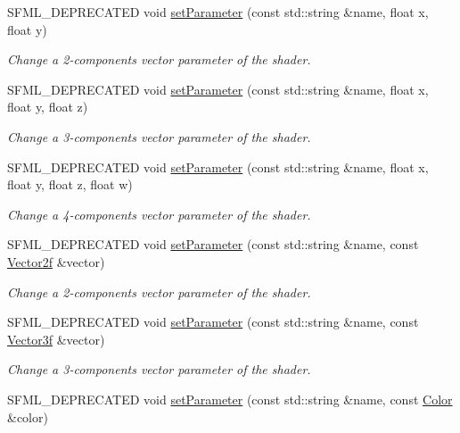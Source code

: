 \begin{DoxyCompactItemize}
S\+F\+M\+L\+\_\+\+D\+E\+P\+R\+E\+C\+A\+T\+ED void \hyperlink{classsf_1_1_shader_a61f5cdb5847fc3b57335b095a2f3dad3}{set\+Parameter} (const std\+::string \&name, float x, float y)
\begin{DoxyCompactList}\small\item\em Change a 2-\/components vector parameter of the shader. \end{DoxyCompactList}\item 
S\+F\+M\+L\+\_\+\+D\+E\+P\+R\+E\+C\+A\+T\+ED void \hyperlink{classsf_1_1_shader_a1fa0fb11cabd8553ccd37e97c725c992}{set\+Parameter} (const std\+::string \&name, float x, float y, float z)
\begin{DoxyCompactList}\small\item\em Change a 3-\/components vector parameter of the shader. \end{DoxyCompactList}\item 
S\+F\+M\+L\+\_\+\+D\+E\+P\+R\+E\+C\+A\+T\+ED void \hyperlink{classsf_1_1_shader_a6d6b84575a5f1a869d70a126df8d6478}{set\+Parameter} (const std\+::string \&name, float x, float y, float z, float w)
\begin{DoxyCompactList}\small\item\em Change a 4-\/components vector parameter of the shader. \end{DoxyCompactList}\item 
S\+F\+M\+L\+\_\+\+D\+E\+P\+R\+E\+C\+A\+T\+ED void \hyperlink{classsf_1_1_shader_aee671dda9a84f607b9b780b2796def74}{set\+Parameter} (const std\+::string \&name, const \hyperlink{classsf_1_1_vector2}{Vector2f} \&vector)
\begin{DoxyCompactList}\small\item\em Change a 2-\/components vector parameter of the shader. \end{DoxyCompactList}\item 
S\+F\+M\+L\+\_\+\+D\+E\+P\+R\+E\+C\+A\+T\+ED void \hyperlink{classsf_1_1_shader_abf1eb5e74f216c7bcfaf34d08c960ee0}{set\+Parameter} (const std\+::string \&name, const \hyperlink{classsf_1_1_vector3}{Vector3f} \&vector)
\begin{DoxyCompactList}\small\item\em Change a 3-\/components vector parameter of the shader. \end{DoxyCompactList}\item 
S\+F\+M\+L\+\_\+\+D\+E\+P\+R\+E\+C\+A\+T\+ED void \hyperlink{classsf_1_1_shader_a66e68e64c06ef5501e50dd5903cab51c}{set\+Parameter} (const std\+::string \&name, const \hyperlink{classsf_1_1_color}{Color} \&color)

\end{DoxyCompactItemize}
